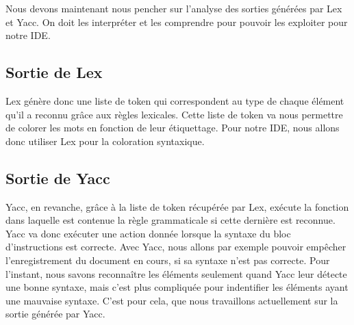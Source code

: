 \documentclass[a4paper,12pt]{article}
\begin{document}
	Nous devons maintenant nous pencher sur l'analyse des sorties générées par Lex et Yacc. On doit les interpréter et les comprendre pour pouvoir les exploiter pour notre IDE.


	\subsection{Sortie de Lex}

		Lex génère donc une liste de token qui correspondent au type de chaque élément qu'il a reconnu grâce aux règles lexicales. Cette liste de token va nous permettre de colorer les mots en fonction de leur étiquettage. Pour notre IDE, nous allons donc utiliser Lex pour la coloration syntaxique. 
	
	\subsection{Sortie de Yacc}

		Yacc, en revanche, grâce à la liste de token récupérée par Lex, exécute la fonction dans laquelle est contenue la règle grammaticale si cette dernière est reconnue. Yacc va donc exécuter une action donnée lorsque la syntaxe du bloc d'instructions est correcte. Avec Yacc, nous allons par exemple pouvoir empêcher l'enregistrement du document en cours, si sa syntaxe n'est pas correcte.
		Pour l'instant, nous savons reconnaître les éléments seulement quand Yacc leur détecte une bonne syntaxe, mais c'est plus compliquée pour indentifier les éléments ayant une mauvaise syntaxe. C'est pour cela, que nous travaillons actuellement sur la sortie générée par Yacc. 

			
			
			
			
\end{document}
